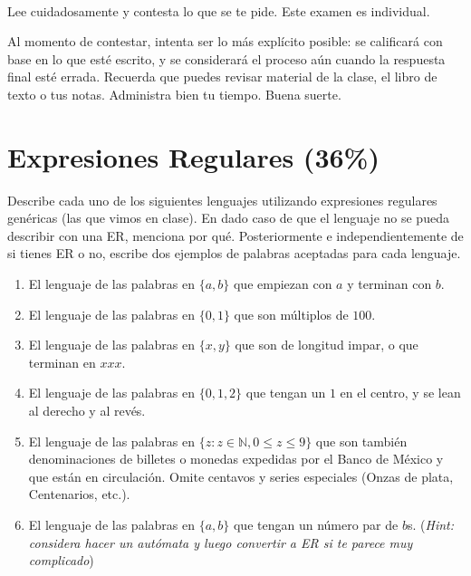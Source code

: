 \documentclass[8pt, onside]{article}
\title{
    \myclass \\
    \textbf{\mytitle} \\
    \myheader
    \date{}
}
\begin{document}
\maketitle

\vspace{-1.5cm}

Lee cuidadosamente y contesta lo que se te pide.
Este examen es individual.

Al momento de contestar, intenta ser lo más explícito posible: se calificará con base en lo que esté escrito, y se considerará el proceso aún cuando la respuesta final esté errada.
Recuerda que puedes revisar material de la clase, el libro de texto o tus notas.
Administra bien tu tiempo.
Buena suerte.

\section{Expresiones Regulares (36\%)}

Describe cada uno de los siguientes lenguajes utilizando expresiones regulares genéricas (las que vimos en clase).
En dado caso de que el lenguaje no se pueda describir con una ER, menciona por qué.
Posteriormente e independientemente de si tienes ER o no, escribe dos ejemplos de palabras aceptadas para cada lenguaje.

\begin{enumerate}[label=\tt \alph*)]
    \itemsep0em
    \item El lenguaje de las palabras en $\{a,b\}$ que empiezan con $a$ y terminan con $b$.
    \item El lenguaje de las palabras en $\{0,1\}$ que son múltiplos de $100$.
    \item El lenguaje de las palabras en $\{x, y\}$ que son de longitud impar, o que terminan en $xxx$.
    \item El lenguaje de las palabras en $\{0,1,2\}$ que tengan un $1$ en el centro, y se lean al derecho y al revés.
    \item El lenguaje de las palabras en $\{z : z \in \mathbb{N}, 0 \leq z \leq 9\}$ que son también denominaciones de billetes o monedas expedidas por el Banco de México y que están en circulación. Omite centavos y series especiales (Onzas de plata, Centenarios, etc.).
    \item El lenguaje de las palabras en $\{a,b\}$ que tengan un número par de $b$s. (\textit{Hint: considera hacer un autómata y luego convertir a ER si te parece muy complicado})
\end{enumerate}
\end{document}
